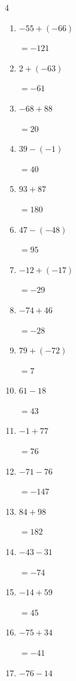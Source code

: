 \begin{multicols}{4}
\begin{enumerate}
  \item $-55+(-66)$

        $=-121$

  \item $2+(-63)$

        $=-61$

  \item $-68+88$

        $=20$

  \item $39-(-1)$

        $=40$

  \item $93+87$

        $=180$

  \item $47-(-48)$

        $=95$

  \item $-12+(-17)$

        $=-29$

  \item $-74+46$

        $=-28$

  \item $79+(-72)$

        $=7$

\columnbreak %

  \item $61-18$

        $=43$

  \item $-1+77$

        $=76$

  \item $-71-76$

        $=-147$

  \item $84+98$

        $=182$

  \item $-43-31$

        $=-74$

  \item $-14+59$

        $=45$

  \item $-75+34$

        $=-41$

  \item $-76-14$


\end{enumerate}
\end{multicols}
